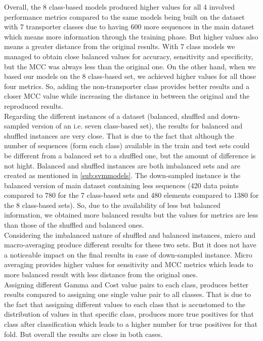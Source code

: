     Overall, the 8 class-based models produced higher values for all 4 involved performance metrics compared to the same models 
    being built on the dataset with 7 transporter classes due to having 600 more sequences in the main dataset which means more 
    information through the training phase. But higher values also means a greater distance from the original results. 
    With 7 class models we managed to obtain close balanced values for accuracy, sensitivity and specificity, 
    but the MCC was always less than the original one. On the other hand, when we based our models on the 8 class-based set, 
    we achieved higher values for all those four metrics.
    So, adding the non-transporter class provides better results and a closer MCC value while increasing the distance 
    in between the original and the reproduced results.\\
    
    Regarding the different instances of a dataset (balanced, shuffled and down-sampled version of an i.e. seven class-based set), 
    the results for balanced and shuffled instances are very close. That is due to the fact that although the number of sequences 
    (form each class) available in the train and test sets could be different from a balanced set to a shuffled one, 
    but the amount of difference is not hight. Balanced and shuffled instances are both imbalanced sets and are created as 
    mentioned in  \ref{sub:svmmodels}.
    The down-sampled instance is the balanced version of main dataset containing less sequences (420 data points compared to 780 
    for the 7 class-based sets and 480 elements compared to 1380 for the 8 class-based sets). 
    So, due to the availability of less but balanced information, we obtained more balanced results 
    but the values for metrics are less than those of the shuffled and balanced ones.\\ 
    
    Considering the imbalanced nature of shuffled and balanced instances, micro and macro-averaging produce different results 
    for these two sets. But it does not have a noticeable impact on the final results in case of down-sampled instance. 
    Micro averaging provides higher values for sensitivity and MCC metrics which leads to more balanced result 
    with less distance from the original ones.\\
    
    Assigning different Gamma and Cost value pairs to each class, produces better results compared to assigning 
    one single value pair to all classes. That is due to the fact that assigning different values to each class that is 
    accustomed to the distribution of values in that specific class, produces more true positives for that class after 
    classification which leads to a higher number for true positives for that fold. 
    But overall the results are close in both cases. \\
    
